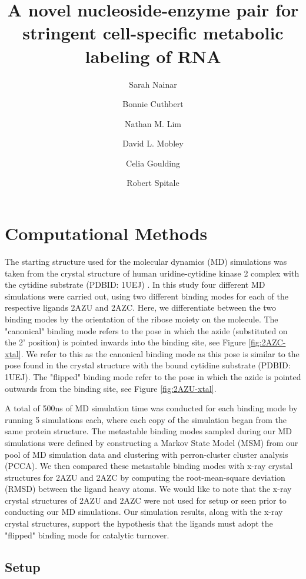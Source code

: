 \documentclass[fleqn,10pt]{wlscirep}
\title{A novel nucleoside-enzyme pair for stringent cell-specific metabolic labeling of RNA}
\author[1]{Sarah Nainar}
\author[1]{Bonnie Cuthbert}
\author[1]{Nathan M. Lim}
\author[1]{David L. Mobley}
\author[1]{Celia Goulding}
\author[1, *]{Robert Spitale}
\affil[1]{Department of Pharmaceutical Sciences, University of California---Irvine, Irvine, California 92697, United States}
\affil[*]{rspitale@uci.edu}
\begin{document}
\flushbottom
\maketitle
\tableofcontents

\section{Computational Methods}
The starting structure used for the molecular dynamics (MD) simulations was taken from the crystal structure of human uridine-cytidine kinase 2 complex with the cytidine substrate (PDBID: 1UEJ) \cite{suzuki2004structural}.
In this study four different MD simulations were carried out, using two different binding modes for each of the respective ligands 2AZU and 2AZC.
Here, we differentiate between the two binding modes by the orientation of the ribose moiety on the molecule.
The "canonical" binding mode refers to the pose in which the azide (substituted on the 2' position) is pointed inwards into the binding site, see Figure \ref{fig:2AZC-xtal}.
We refer to this as the canonical binding mode as this pose is similar to the pose found in the crystal structure with the bound cytidine substrate (PDBID: 1UEJ).
The "flipped" binding mode refer to the pose in which the azide is pointed outwards from the binding site, see Figure \ref{fig:2AZU-xtal}.

A total of 500ns of MD simulation time was conducted for each binding mode by running 5 simulations each, where each copy of the simulation began from the same protein structure.
The metastable binding modes sampled during our MD simulations were defined by constructing a Markov State Model (MSM) from our pool of MD simulation data and clustering with perron-cluster cluster analysis (PCCA).
We then compared these metastable binding modes with x-ray crystal structures for 2AZU and 2AZC by computing the root-mean-square deviation (RMSD) between the ligand heavy atoms.
We would like to note that the x-ray crystal structures of 2AZU and 2AZC were not used for setup or seen prior to conducting our MD simulations.
Our simulation results, along with the x-ray crystal structures, support the hypothesis that the ligands must adopt the "flipped" binding mode for catalytic turnover.

\subsection{Setup}
\end{document}
